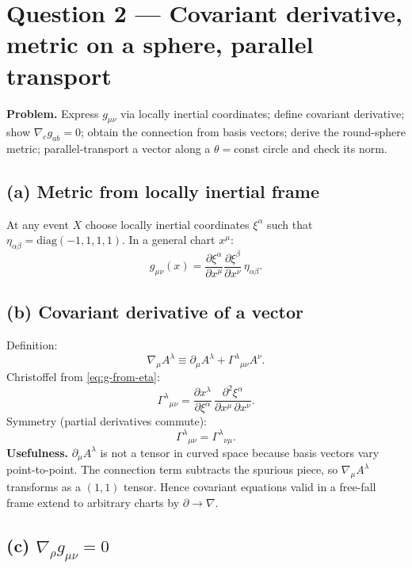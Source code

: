 \documentclass[11pt]{article}
\begin{document}
\section*{Question 2 --- Covariant derivative, metric on a sphere, parallel transport}

\textbf{Problem.} Express $g_{\mu\nu}$ via locally inertial coordinates; define covariant derivative; show $\nabla_c g_{ab}=0$; obtain the connection from basis vectors; derive the round-sphere metric; parallel-transport a vector along a $\theta=$const circle and check its norm.

\subsection*{(a) Metric from locally inertial frame}

At any event $X$ choose locally inertial coordinates $\xi^\alpha$ such that $\eta_{\alpha\beta}=\mathrm{diag}(-1,1,1,1)$. In a general chart $x^\mu$:
\begin{equation}
\boxed{\;g_{\mu\nu}(x)=\frac{\partial \xi^\alpha}{\partial x^\mu}\frac{\partial \xi^\beta}{\partial x^\nu}\,\eta_{\alpha\beta}.\;}
\label{eq:g-from-eta}
\end{equation}

\subsection*{(b) Covariant derivative of a vector}

Definition:
\begin{equation}
\nabla_\mu A^\lambda\equiv\partial_\mu A^\lambda+\Gamma^{\lambda}{}_{\mu\nu}A^\nu.
\label{eq:cov-der}
\end{equation}
Christoffel from \eqref{eq:g-from-eta}:
\[ \Gamma^{\lambda}{}_{\mu\nu}=\frac{\partial x^\lambda}{\partial \xi^\alpha}\,\frac{\partial^2 \xi^\alpha}{\partial x^\mu\,\partial x^\nu}. \]
Symmetry (partial derivatives commute):
\[ \Gamma^{\lambda}{}_{\mu\nu}=\Gamma^{\lambda}{}_{\nu\mu}. \]
\textbf{Usefulness.} $\partial_\mu A^\lambda$ is not a tensor in curved space because basis vectors vary point-to-point. The connection term subtracts the spurious piece, so $\nabla_\mu A^\lambda$ transforms as a $(1,1)$ tensor. Hence covariant equations valid in a free-fall frame extend to arbitrary charts by $\partial\to\nabla$.

\subsection*{(c) $\nabla_\rho g_{\mu\nu}=0$}
\end{document}
